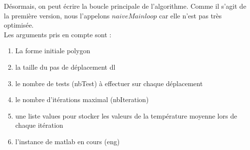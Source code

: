 \documentclass[a4paper,reqno]{article}
\begin{document}
\vspace{3cm}
Désormais, on peut écrire la boucle principale de l'algorithme. Comme il s'agit de la première version, nous l'appelons $naiveMainloop$ car elle n'est pas très optimisée. \\
Les arguments pris en compte sont : 
\begin{enumerate}
\item La forme initiale polygon
\item la taille du pas de déplacement dl 
\item le nombre de tests (nbTest) à effectuer sur chaque déplacement
\item le nombre d'itérations maximal (nbIteration)
\item une liste values pour stocker les valeurs de la température moyenne lors de chaque itération
\item l'instance de matlab en cours (eng)
\end{enumerate}
\end{document}
